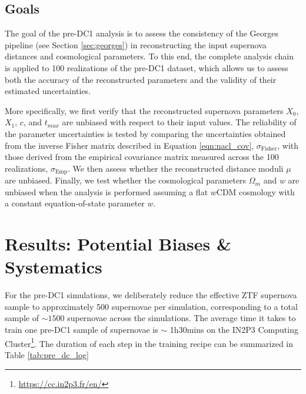 \subsection{Goals}

The goal of the pre-DC1 analysis is to assess the consistency of the 
Georges pipeline (see Section \ref{sec:georges}) in reconstructing the input supernova distances and 
cosmological parameters. To this end, the complete analysis chain is applied 
to 100 realizations of the pre-DC1 dataset, which allows us to assess both the 
accuracy of the reconstructed parameters and the validity of their estimated 
uncertainties. 

More specifically, we first verify that the reconstructed supernova 
parameters $X_0$, $X_1$, $c$, and $t_{max}$ are unbiased with respect 
to their input values. The reliability of the parameter uncertainties is 
tested by comparing the uncertainties obtained from the inverse Fisher 
matrix described in Equation \ref{eqn:nacl_cov}, $\sigma_{\text{Fisher}}$, with those derived from the empirical 
covariance matrix measured across the 100 realizations, 
$\sigma_{\text{Emp}}$. We then assess whether the reconstructed distance 
moduli $\mu$ are unbiased. Finally, we test whether the cosmological parameters 
$\Omega_m$ and $w$ are unbiased when the analysis is performed assuming a 
flat $w$CDM cosmology with a constant equation-of-state parameter $w$. 


\section{Results: Potential Biases \& Systematics}
For the pre-DC1 simulations, we deliberately reduce the effective ZTF supernova sample to approximately 500 supernovae per simulation, corresponding to a 
total sample of $\sim 1500$ supernovae across the simulations. 
The average time it takes to train one pre-DC1 sample of supernovae is $\sim$ 1h30mins on the IN2P3 Computing Cluster\footnote{\url{https://cc.in2p3.fr/en/}}. 
The duration of each step in the training recipe can be summarized in Table \ref{tab:pre_dc_log}\\

